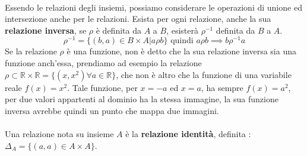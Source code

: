 \documentclass[12pt, letterpaper]{article}
\begin{document}
    \\ 
 \raggedright
 Essendo le relazioni degli insiemi, possiamo considerare le operazioni di unione ed intersezione
 anche per le relazioni. Esista per ogni relazione, anche la sua \textbf{relazione inversa},
 se \(\rho\) è definita da \(A\) a \(B\), esisterà \(\rho^{-1}\) definita da \(B\) a \(A\).
 \begin{equation}
    \rho^{-1} = \{ (b,a) \in B\times A | a\rho b\} \text{ quindi } a\rho b \implies b\rho^{-1} a
 \end{equation}
 Se la relazione \(\rho\) è una funzione, non è detto che la sua relazione inversa sia una funzione anch'essa,
 prendiamo ad esempio la relazione \(\rho \subset \mathbb{R} \times \mathbb{R}  =\{ (x,x^2) \forall a\in \mathbb{R}\}\), che non è altro che
 la funzione di una variabile reale \(f(x)=x^2\). Tale funzione, per \(x=-a\) ed \(x=a\), ha sempre \(f(x)=a^2\), per due valori
 appartenti al dominio ha la stessa immagine, la sua funzione inversa avrebbe quindi un punto che mappa due immagini.
\\\hphantom{.}\\
Una relazione nota su insieme \(A\) è la \textbf{relazione identità}, definita : \(\Delta_A = \{(a,a)\in A \times A\}\).
\end{document}
